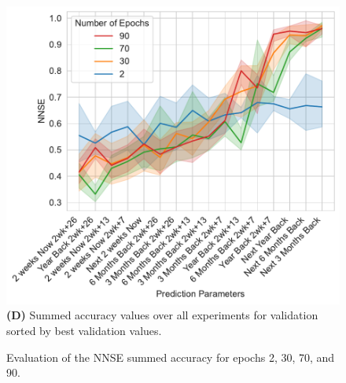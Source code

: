 \documentclass[utf8]{FrontiersinVancouver} %
\begin{document}
\begin{figure}[p]
{\begin{center}
\begin{minipage}[t]{0.49\textwidth}
     \end{minipage}
  \ \
     \begin{minipage}[t]{0.49\textwidth}
        \includegraphics[width=1.0\linewidth]{images/NNSE-all-epochs-validation-summed}
        {\bf (D)} Summed accuracy values over all experiments for validation sorted by best validation values.
     \end{minipage}

  \end{center}
  }
  
  \caption {Evaluation of the NNSE summed accuracy for epochs 2, 30, 70, and 90.}
  \label{fig:NNSE-comparison-a100-summed}

\end{figure}
\end{document}
